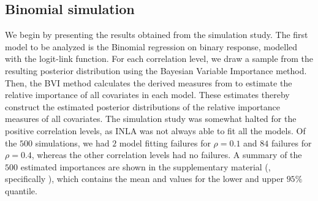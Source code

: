 \subsection{Binomial simulation}
We begin by presenting the results obtained from the simulation study. The first model to be analyzed is the Binomial regression on binary response, modelled with the logit-link function. For each correlation level, we draw a sample from the resulting posterior distribution using the Bayesian Variable Importance method. Then, the BVI method calculates the derived measures from  to estimate the relative importance of all covariates in each model. These estimates thereby construct the estimated posterior distributions of the relative importance measures of all covariates. The simulation study was somewhat halted for the positive correlation levels, as INLA was not always able to fit all the models. Of the $500$ simulations, we had $2$ model fitting failures for $\rho=0.1$ and $84$ failures for $\rho=0.4$, whereas the other correlation levels had no failures. A summary of the $500$ estimated importances are shown in the supplementary material (, specifically ), which contains the mean and values for the lower and upper $95\%$ quantile.
